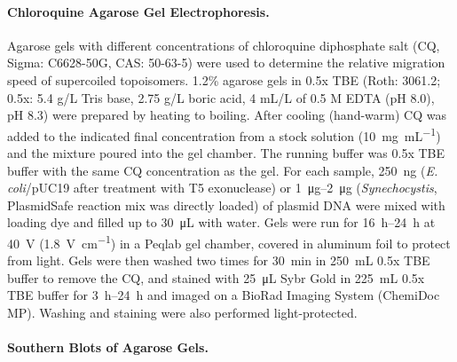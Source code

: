 \documentclass[10pt,a4]{article}
\newcommand{\ugml}{\micro\gram\per\milli\liter}
\newcommand{\mL}{\milli\liter}
\newcommand{\scyst}{\textit{Synechocystis}}
\newcommand{\remove}[1]{\begingroup\color{gray}\endgroup}
\begin{document}
\remove{To test plasmid relaxation by topoisomerase I pooled samples
  from light and dark phases were split and for each reaction
  \SI{10}{\uL} of plasmid extracts were mixed with \SI{5}{\uL} 3x
  reaction buffer (150 mM Tris, 150 mM KCl, 30 mM MgCl2 , 1.5 mM DTT,
  0.3 mM EDTA, \SI{90}{\ugml} BSA) with or without 1 U of TopoI
  (Invitrogen, Cat. no. 38042-024). The reactions were incubated at
  \SI{37}{\celsius} and stopped after the indicated times by addition
  of \SI{3}{\uL} of 6x DNA loading dye with \SI{1}{\percent} SDS at
  \SI{80}{\celsius} for \SI{15}{\minute}. The resulting \SI{18}{\uL}
  were loaded onto the agarose gel (Fig. \ref{fig:diurnalcq}E).}

\paragraph{Chloroquine Agarose Gel Electrophoresis.}
Agarose gels with different concentrations of chloroquine diphosphate
salt (CQ, Sigma: C6628-50G, CAS: 50-63-5) were used to determine the
relative migration speed of supercoiled topoisomers. 1.2\% agarose
gels in 0.5x TBE (Roth: 3061.2; 0.5x: 5.4 g/L Tris base, 2.75 g/L
boric acid, 4 mL/L of 0.5 M EDTA (pH 8.0), pH 8.3) were prepared by
heating to boiling. After cooling (hand-warm) CQ was added to the
indicated final concentration from a stock solution
(\SI{10}{\milli\gram\per\milli\liter}) and the mixture poured into the
gel chamber. The running buffer was 0.5x TBE buffer with the same CQ
concentration as the gel. For each sample, \SI{250}{\ng}
(\textit{E. coli}/pUC19 after treatment with T5 exonuclease) or
\SIrange{1}{2}{\ug} (\scyst{}, PlasmidSafe reaction mix was directly
loaded) of plasmid DNA were mixed with loading dye and filled up to
\SI{30}{\uL} with water.  Gels were run for \SIrange{16}{24}{\hour} at
\SI{40}{\volt} (\SI{1.8}{\volt\per\cm}) in a Peqlab gel chamber,
covered in aluminum foil to protect from light. Gels were then washed
two times for \SI{30}{\minute} in \SI{250}{\mL} 0.5x TBE buffer to
remove the CQ, and stained with \SI{25}{\uL} Sybr Gold in
\SI{225}{\mL} 0.5x TBE buffer for \SIrange{3}{24}{\hour} and imaged on
a BioRad Imaging System (ChemiDoc MP). Washing and staining were also
performed light-protected.

\paragraph{Southern Blots of Agarose Gels.}
\end{document}
